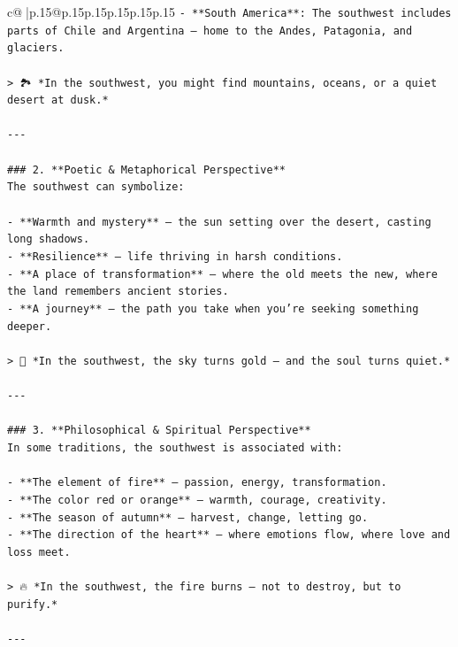 \documentclass{article}
\begin{document}
{\begin{supertabular}{c@{$\;$}|p{.15\linewidth}@{}p{.15\linewidth}p{.15\linewidth}p{.15\linewidth}p{.15\linewidth}p{.15\linewidth}}
{{{\texttt{{-} **South America**: The southwest includes parts of Chile and Argentina — home to the Andes, Patagonia, and glaciers.} \\
\\ 
\texttt{> 🏞️ *In the southwest, you might find mountains, oceans, or a quiet desert at dusk.*} \\
\\ 
\texttt{{-}{-}{-}} \\
\\ 
\texttt{\#\#\# 2. **Poetic \& Metaphorical Perspective**  } \\
\texttt{The southwest can symbolize:} \\
\\ 
\texttt{{-} **Warmth and mystery** — the sun setting over the desert, casting long shadows.} \\
\texttt{{-} **Resilience** — life thriving in harsh conditions.} \\
\texttt{{-} **A place of transformation** — where the old meets the new, where the land remembers ancient stories.} \\
\texttt{{-} **A journey** — the path you take when you’re seeking something deeper.} \\
\\ 
\texttt{> 🌄 *In the southwest, the sky turns gold — and the soul turns quiet.*} \\
\\ 
\texttt{{-}{-}{-}} \\
\\ 
\texttt{\#\#\# 3. **Philosophical \& Spiritual Perspective**  } \\
\texttt{In some traditions, the southwest is associated with:} \\
\\ 
\texttt{{-} **The element of fire** — passion, energy, transformation.} \\
\texttt{{-} **The color red or orange** — warmth, courage, creativity.} \\
\texttt{{-} **The season of autumn** — harvest, change, letting go.} \\
\texttt{{-} **The direction of the heart** — where emotions flow, where love and loss meet.} \\
\\ 
\texttt{> 🔥 *In the southwest, the fire burns — not to destroy, but to purify.*} \\
\\ 
\texttt{{-}{-}{-}} \\
\\ 
}}}
\end{supertabular}}
\end{document}
